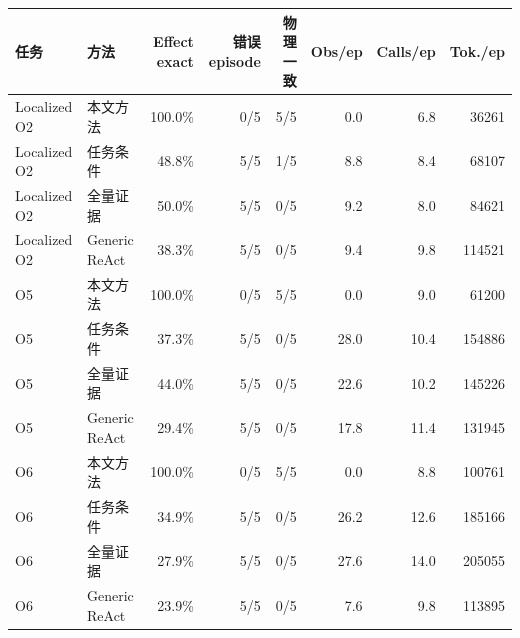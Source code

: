 \begin{tabular}{llrrrrrr}
\toprule
任务 & 方法 & Effect exact & 错误 episode & 物理一致 & Obs/ep & Calls/ep & Tok./ep \\
\midrule
Localized O2 & 本文方法 & 100.0\% & 0/5 & 5/5 & 0.0 & 6.8 & 36261 \\
Localized O2 & 任务条件 & 48.8\% & 5/5 & 1/5 & 8.8 & 8.4 & 68107 \\
Localized O2 & 全量证据 & 50.0\% & 5/5 & 0/5 & 9.2 & 8.0 & 84621 \\
Localized O2 & Generic ReAct & 38.3\% & 5/5 & 0/5 & 9.4 & 9.8 & 114521 \\
O5 & 本文方法 & 100.0\% & 0/5 & 5/5 & 0.0 & 9.0 & 61200 \\
O5 & 任务条件 & 37.3\% & 5/5 & 0/5 & 28.0 & 10.4 & 154886 \\
O5 & 全量证据 & 44.0\% & 5/5 & 0/5 & 22.6 & 10.2 & 145226 \\
O5 & Generic ReAct & 29.4\% & 5/5 & 0/5 & 17.8 & 11.4 & 131945 \\
O6 & 本文方法 & 100.0\% & 0/5 & 5/5 & 0.0 & 8.8 & 100761 \\
O6 & 任务条件 & 34.9\% & 5/5 & 0/5 & 26.2 & 12.6 & 185166 \\
O6 & 全量证据 & 27.9\% & 5/5 & 0/5 & 27.6 & 14.0 & 205055 \\
O6 & Generic ReAct & 23.9\% & 5/5 & 0/5 & 7.6 & 9.8 & 113895 \\
\bottomrule
\end{tabular}

